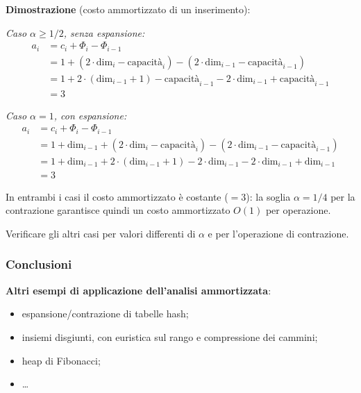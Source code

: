 \documentclass[12pt, a4paper]{article}
\begin{document}
\textbf{Dimostrazione} (costo ammortizzato di un inserimento):

\textit{Caso $\alpha \ge 1/2$, senza espansione:}
\begin{align*}
a_i &= c_i + \Phi_i - \Phi_{i-1} \\
    &= 1 + (2\cdot\text{dim}_i - \text{capacità}_i) - (2\cdot\text{dim}_{i-1} - \text{capacità}_{i-1}) \\
    &= 1 + 2\cdot(\text{dim}_{i-1}+1) - \text{capacità}_{i-1} - 2\cdot\text{dim}_{i-1} + \text{capacità}_{i-1} \\
    &= 3
\end{align*}

\textit{Caso $\alpha = 1$, con espansione:}
\begin{align*}
a_i &= c_i + \Phi_i - \Phi_{i-1} \\
    &= 1 + \text{dim}_{i-1} + (2\cdot\text{dim}_i - \text{capacità}_i) - (2\cdot\text{dim}_{i-1} - \text{capacità}_{i-1}) \\
    &= 1 + \text{dim}_{i-1} + 2\cdot(\text{dim}_{i-1}+1) - 2\cdot\text{dim}_{i-1} - 2\cdot\text{dim}_{i-1} + \text{dim}_{i-1} \\
    &= 3
\end{align*}

In entrambi i casi il costo ammortizzato è costante ($=3$): la soglia $\alpha=1/4$ per la contrazione garantisce quindi un costo ammortizzato $O(1)$ per operazione.

\begin{tcolorbox}[colback=lightergray!10, colframe=tocsec, title=\textbf{Esercizio (non risolto nelle slide originali)}]
Verificare gli altri casi per valori differenti di $\alpha$ e per l'operazione di contrazione.
\end{tcolorbox}

\subsubsection{Conclusioni}

\textbf{Altri esempi di applicazione dell'analisi ammortizzata}:
\begin{itemize}
    \item espansione/contrazione di tabelle hash;
    \item insiemi disgiunti, con euristica sul rango e compressione dei cammini;
    \item heap di Fibonacci;
    \item \dots
\end{itemize}
\end{document}
